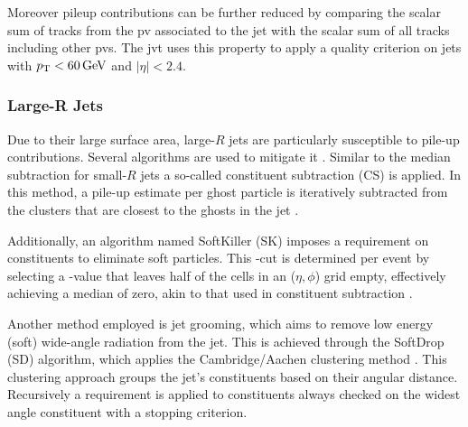Moreover pileup contributions can be further reduced by comparing the scalar \pt sum of tracks from the \ac{pv} associated to the jet with the scalar \pt sum of all tracks including other \acp{pv}. The \ac{jvt} \citep{ATLAS-CONF-2014-018} uses this property to apply a quality criterion on jets with $p_{\text{T}}<\qty[]{60}{GeV}$ and $|\eta|<2.4$.


\subsubsection{Large-R Jets}
Due to their large surface area, large-$R$ jets are particularly susceptible to pile-up contributions. Several algorithms are used to mitigate it \citep{atlas2021optimisation}. Similar to the median \pt subtraction for small-$R$ jets a so-called constituent subtraction (CS) is applied. In this method, a pile-up estimate per ghost particle is iteratively subtracted from the clusters that are closest to the ghosts in the jet \citep{ATLAS-CONF-2017-065}.

Additionally, an algorithm named SoftKiller (SK) imposes a \pt requirement on constituents to eliminate soft particles. This \pt-cut is determined per event by selecting a \pt-value that leaves half of the cells in an ($\eta,\phi$) grid empty, effectively achieving a median \pt of zero, akin to that used in constituent subtraction \citep{ATLAS-CONF-2017-065}.

Another method employed is jet grooming, which aims to remove low energy (soft) wide-angle radiation from the jet. This is achieved through the SoftDrop (SD) algorithm, which applies the Cambridge/Aachen clustering method \citep{Larkoski_2014}. This clustering approach groups the jet's constituents based on their angular distance. Recursively a \pt requirement is applied to constituents always checked on the widest angle constituent with a stopping criterion.






